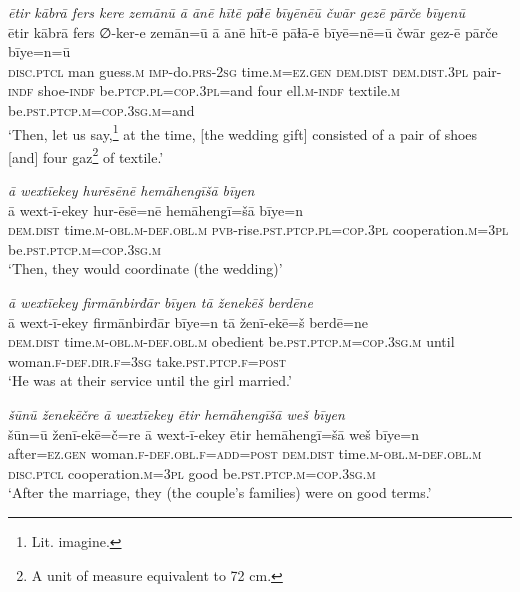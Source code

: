 \ea \label{RE.11}
\textit{ētir kābrā fers kere zemānū ā ānē hītē pāɫē bīyēnēū čwār gezē pārče bīyenū} \\ 
\gll ētir kābrā fers ∅-ker-e zemān=ū ā ānē hīt-ē pāɫā-ē bīyē=nē=ū čwār gez-ē pārče bīye=n=ū \\ 
 \textsc{disc.ptcl} man guess\textsc{.m} \textsc{imp-}do\textsc{.prs}-\textsc{2sg} time\textsc{.m}\textsc{=ez.gen} \textsc{dem.dist} \textsc{dem.dist}\textsc{.3pl} pair\textsc{-indf} shoe\textsc{-indf} be\textsc{.ptcp}\textsc{.pl}\textsc{=cop}\textsc{.3pl}=and four ell\textsc{.m}\textsc{-indf} textile\textsc{.m} be\textsc{.pst}\textsc{.ptcp}\textsc{.m}\textsc{=cop}\textsc{.3sg}\textsc{.m}=and \\ 
\glt `Then, let us say,\footnote{Lit. imagine.} at the time, [the wedding gift] consisted of a pair of shoes [and] four gaz\footnote{A unit of measure equivalent to 72 cm.} of textile.'
\z 
 
\ea \label{RE.14}
\textit{ā wextīekey hurēsēnē hemāhengīšā bīyen} \\ 
\gll ā wext-ī-ekey hur-ēsē=nē hemāhengī=šā bīye=n \\ 
 \textsc{dem.dist} time\textsc{.m}\textsc{-obl}\textsc{.m}\textsc{-def}\textsc{.obl}\textsc{.m} \textsc{pvb-}rise\textsc{.pst}\textsc{.ptcp}\textsc{.pl}\textsc{=cop}\textsc{.3pl} cooperation\textsc{.m}\textsc{=3pl} be\textsc{.pst}\textsc{.ptcp}\textsc{.m}\textsc{=cop}\textsc{.3sg}\textsc{.m} \\ 
\glt `Then, they would coordinate (the wedding)'
\z 
 
\ea \label{RE.21}
\textit{ā wextīekey firmānbirđār bīyen tā ženekēš berdēne} \\ 
\gll ā wext-ī-ekey firmānbirđār bīye=n tā ženī-ekē=š berdē=ne \\ 
 \textsc{dem.dist} time\textsc{.m}\textsc{-obl}\textsc{.m}\textsc{-def}\textsc{.obl}\textsc{.m} obedient be\textsc{.pst}\textsc{.ptcp}\textsc{.m}\textsc{=cop}\textsc{.3sg}\textsc{.m} until woman\textsc{.f}\textsc{-def}\textsc{.dir}\textsc{.f}\textsc{=3sg} take\textsc{.pst}\textsc{.ptcp}\textsc{.f}\textsc{=\textsc{post}} \\ 
\glt `He was at their service until the girl married.'
\z 
 
\ea \label{RE.22}
\textit{šūnū ženekēčre ā wextīekey ētir hemāhengīšā weš bīyen} \\ 
\gll šūn=ū ženī-ekē=č=re ā wext-ī-ekey ētir hemāhengī=šā weš bīye=n \\ 
 after\textsc{=ez.gen} woman\textsc{.f}\textsc{-def}\textsc{.obl}\textsc{.f}\textsc{=add}\textsc{=\textsc{post}} \textsc{dem.dist} time\textsc{.m}\textsc{-obl}\textsc{.m}\textsc{-def}\textsc{.obl}\textsc{.m} \textsc{disc.ptcl} cooperation\textsc{.m}\textsc{=3pl} good be\textsc{.pst}\textsc{.ptcp}\textsc{.m}\textsc{=cop}\textsc{.3sg}\textsc{.m} \\ 
\glt `After the marriage, they (the couple's families) were on good terms.'
\z 
 
